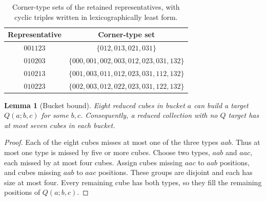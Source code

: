 \documentclass[11pt]{article}
\newtheorem{lemma}{Lemma}
\theoremstyle{remark}
\begin{document}
\begin{table}[ht]
\centering
\begin{tabular}{cc}
\toprule
Representative & Corner-type set\\
\midrule
$001123$ & $\{012,013,021,031\}$\\
$010203$ & $\{000,001,002,003,012,023,031,132\}$\\
$010213$ & $\{001,003,011,012,023,031,112,132\}$\\
$010223$ & $\{002,003,012,022,023,031,122,132\}$\\
\bottomrule
\end{tabular}
\caption{Corner-type sets of the retained representatives, with cyclic
triples written in lexicographically least form.}
\label{tab:corners}
\end{table}

\begin{lemma}[Bucket bound]\label{lem:bucket}
Eight reduced cubes in bucket $a$ can build a target $Q(a;b,c)$ for some
$b,c$. Consequently, a reduced collection with no $Q$ target has at most
seven cubes in each bucket.
\end{lemma}
\begin{proof}
Each of the eight cubes misses at most one of the three types $aab$.
Thus at most one type is missed by five or more cubes. Choose two types,
$aab$ and $aac$, each missed by at most four cubes. Assign cubes missing
$aac$ to $aab$ positions, and cubes missing $aab$ to $aac$ positions.
These groups are disjoint and each has size at most four. Every remaining
cube has both types, so they fill the remaining positions of
$Q(a;b,c)$.
\end{proof}
\end{document}
